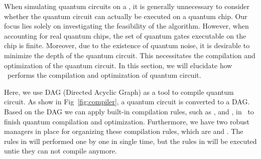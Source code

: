 

When simulating quantum circuits on a \Simulator, it is generally unnecessary to consider whether the quantum circuit can actually be executed on a quantum chip. Our focus lies solely on investigating the feasibility of the algorithm. However, when accounting for real quantum chips, the set of quantum gates executable on the chip is finite. Moreover, due to the existence of quantum noise, it is desirable to minimize the depth of the quantum circuit. This necessitates the compilation and optimization of the quantum circuit. In this section, we will elucidate how \MindQuantum\ performs the compilation and optimization of quantum circuit.

Here, we use DAG (Directed Acyclic Graph) as a tool to compile quantum circuit. As show in Fig~\ref{fig:compiler}, a quantum circuit is converted to a DAG. Based on the DAG we can apply built-in compilation rules, such as \BasicDecompose, \FullyNeighborCanceler and \GateReplacer, in \MindQuantum\ to finish quantum compilation and optimization. Furthermore, we have two robust managers in place for organizing these compilation rules, which are \SequentialCompiler and \KroneckerSeqCompiler. The rules in \SequentialCompiler will performed one by one in single time, but the rules in \KroneckerSeqCompiler will be executed untie they can not compile anymore.

